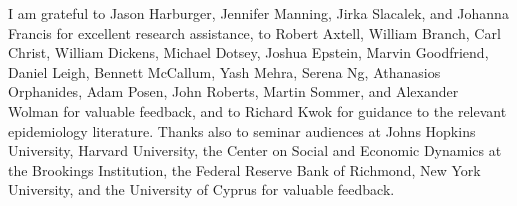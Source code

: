 I am grateful to Jason Harburger, Jennifer Manning, Jirka Slacalek,
and Johanna Francis for excellent research assistance, to Robert
Axtell, William Branch, Carl Christ, William Dickens, Michael Dotsey,
Joshua Epstein, Marvin Goodfriend, Daniel Leigh, Bennett McCallum,
Yash Mehra, Serena Ng, Athanasios Orphanides, Adam Posen, John
Roberts, Martin Sommer, and Alexander Wolman for valuable feedback,
and to Richard Kwok for guidance to the relevant epidemiology
literature.  Thanks also to seminar audiences at Johns Hopkins
University, Harvard University, the Center on Social and Economic
Dynamics at the Brookings Institution, the Federal Reserve Bank of
Richmond, New York University, and the University of Cyprus for
valuable feedback.
